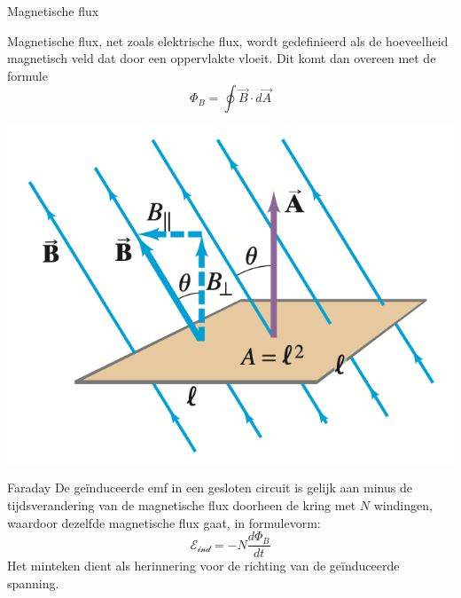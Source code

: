 \begin{theo}{Magnetische flux}
    \vspace{-0.4cm}
    \begin{minipage}{0.77\textwidth}
        Magnetische flux, net zoals elektrische flux, wordt gedefinieerd als de hoeveelheid magnetisch veld dat door een oppervlakte vloeit.
        Dit komt dan overeen met de formule 
        \begin{equation*}
            \Phi_{B} = \oint \Vec{B} \cdot d\Vec{A}
        \end{equation*}
    \end{minipage}
    \begin{minipage}{0.19\textwidth}
        \includegraphics[scale=0.30]{Images/Magnetisme/Faraday.png}
    \end{minipage}
    \vspace{-0.3cm}
\end{theo}
    
\newpage

\begin{lem}[Faraday]{Faraday}
    De geïnduceerde emf in een gesloten circuit is gelijk aan minus de tijdsverandering van de magnetische flux doorheen de kring met $N$ windingen,
    waardoor dezelfde magnetische flux gaat, in formulevorm:
    \begin{equation*}
        \mathcal{E_{\text{ind}}} = -N\dfrac{d\Phi_{B}}{dt}
    \end{equation*}
    Het minteken dient als herinnering voor de richting van de geïnduceerde spanning.
\end{lem}


